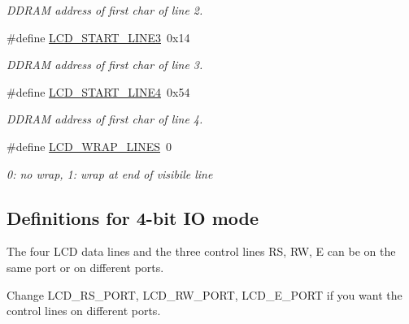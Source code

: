 \begin{DoxyCompactItemize}
\begin{DoxyCompactList}\small\item\em D\+D\+R\+AM address of first char of line 2. \end{DoxyCompactList}\item 
\#define \hyperlink{group__pfleury__lcd_gae7cca16353048a062baeb3a52da55249}{L\+C\+D\+\_\+\+S\+T\+A\+R\+T\+\_\+\+L\+I\+N\+E3}~0x14\hypertarget{group__pfleury__lcd_gae7cca16353048a062baeb3a52da55249}{}\label{group__pfleury__lcd_gae7cca16353048a062baeb3a52da55249}

\begin{DoxyCompactList}\small\item\em D\+D\+R\+AM address of first char of line 3. \end{DoxyCompactList}\item 
\#define \hyperlink{group__pfleury__lcd_gab1b73e05bdb5cc12cdff5a1cf6c4f2a2}{L\+C\+D\+\_\+\+S\+T\+A\+R\+T\+\_\+\+L\+I\+N\+E4}~0x54\hypertarget{group__pfleury__lcd_gab1b73e05bdb5cc12cdff5a1cf6c4f2a2}{}\label{group__pfleury__lcd_gab1b73e05bdb5cc12cdff5a1cf6c4f2a2}

\begin{DoxyCompactList}\small\item\em D\+D\+R\+AM address of first char of line 4. \end{DoxyCompactList}\item 
\#define \hyperlink{group__pfleury__lcd_gadb35ff6cb242e48ba0545ea919ffc5d3}{L\+C\+D\+\_\+\+W\+R\+A\+P\+\_\+\+L\+I\+N\+ES}~0\hypertarget{group__pfleury__lcd_gadb35ff6cb242e48ba0545ea919ffc5d3}{}\label{group__pfleury__lcd_gadb35ff6cb242e48ba0545ea919ffc5d3}

\begin{DoxyCompactList}\small\item\em 0\+: no wrap, 1\+: wrap at end of visibile line \end{DoxyCompactList}\end{DoxyCompactItemize}
\subsection*{Definitions for 4-\/bit IO mode}
\label{_amgrp0d38ed8c5b4202f593f69f9003c1a16c}%
The four L\+CD data lines and the three control lines RS, RW, E can be on the same port or on different ports.

Change L\+C\+D\+\_\+\+R\+S\+\_\+\+P\+O\+RT, L\+C\+D\+\_\+\+R\+W\+\_\+\+P\+O\+RT, L\+C\+D\+\_\+\+E\+\_\+\+P\+O\+RT if you want the control lines on different ports.

